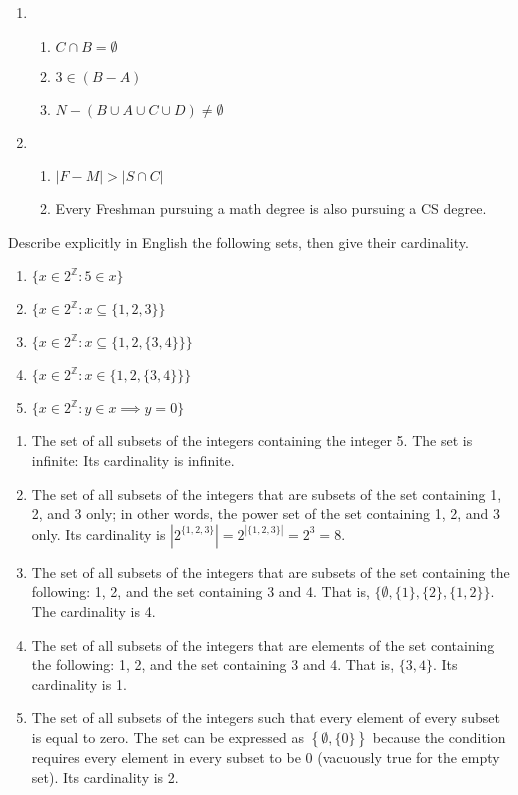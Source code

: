 \documentclass{article}
\newcommand{\Z}{\mathbb{Z}}
\theoremstyle{definition}
\begin{document}
\begin{solution}
\begin{enumerate}
    \item\begin{enumerate}
        \item$C\cap B=\emptyset$
        \item$3\in(B-A)$
        \item$N-(B\cup A\cup C\cup D)\neq\emptyset$
    \end{enumerate}
    \item\begin{enumerate}
        \item$|F-M|>|S\cap C|$
        \item Every Freshman pursuing a math degree is also pursuing a CS degree.
    \end{enumerate}
\end{enumerate}
\end{solution}
\begin{question}
Describe explicitly in English the following sets, then give their cardinality.
\begin{enumerate}
\item $\{x \in 2^{\Z} : 5 \in x \}$
\item $\{x \in 2^{\Z} : x \subseteq \{ 1, 2, 3\} \}$
\item $\{x \in 2^{\Z} : x \subseteq \{ 1, 2, \{3, 4\} \} \}$
\item $\{x \in 2^{\Z} : x \in \{ 1, 2, \{3, 4\} \} \}$
\item $\{x \in 2^{\Z} : y \in x \implies y = 0 \}$
\end{enumerate}
\end{question}
\begin{solution}
\begin{enumerate}
    \item The set of all subsets of the integers containing the integer 5. The set is infinite: Its cardinality is infinite.
    \item The set of all subsets of the integers that are subsets of the set containing 1, 2, and 3 only; in other words, the power set of the set containing 1, 2, and 3 only. Its cardinality is $\left|2^{\{1,2,3\}}\right|=2^{|\{1,2,3\}|}=2^3=8$.
    \item The set of all subsets of the integers that are subsets of the set containing the following: 1, 2, and the set containing 3 and 4. That is, $\{\emptyset,\{1\},\{2\},\{1,2\}\}$. The cardinality is 4.
    \item The set of all subsets of the integers that are elements of the set containing the following: 1, 2, and the set containing 3 and 4. That is, $\{{3,4}\}$. Its cardinality is 1.
    \item The set of all subsets of the integers such that every element of every subset is equal to zero. The set can be expressed as $\left\{\emptyset,\{0\}\right\}$ because the condition requires every element in every subset to be 0 (vacuously true for the empty set). Its cardinality is 2.
\end{enumerate}
\end{solution}
\end{document}
